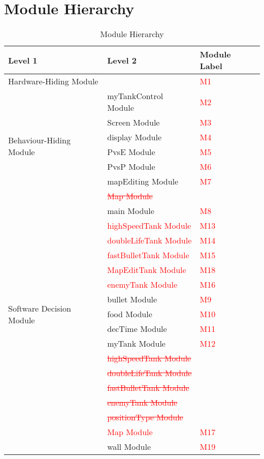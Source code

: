 \documentclass[12pt, titlepage]{article}
\begin{document}
\section{Module Hierarchy}
\begin{table}[h!]
\centering
\begin{tabular}{p{} p{} p{}}
\toprule
\textbf{Level 1} & \textbf{Level 2} & \textbf{Module Label}\\
\midrule

{Hardware-Hiding Module} & & \textcolor{red}{M1} \\
\midrule

\multirow{7}{0.3\textwidth}{Behaviour-Hiding Module} & myTankControl Module & \textcolor{red}{M2}\\
& Screen Module & \textcolor{red}{M3}\\
& display Module & \textcolor{red}{M4}\\
& PvsE Module & \textcolor{red}{M5}\\
& PvsP Module & \textcolor{red}{M6}\\
& mapEditing Module & \textcolor{red}{M7}\\
& \textcolor{red}{\sout{Map Module}}\\
& main Module & \textcolor{red}{M8}\\
& \textcolor{red}{highSpeedTank Module} & \textcolor{red}{M13}\\
& \textcolor{red}{doubleLifeTank Module} & \textcolor{red}{M14}\\
& \textcolor{red}{fastBulletTank Module} & \textcolor{red}{M15}\\
& \textcolor{red}{MapEditTank Module} & \textcolor{red}{M18}\\
& \textcolor{red}{enemyTank Module} & \textcolor{red}{M16}\\

\midrule

\multirow{3}{0.3\textwidth}{Software Decision Module} & bullet Module & \textcolor{red}{M9}\\
& food Module & \textcolor{red}{M10}\\
& decTime Module & \textcolor{red}{M11}\\
& myTank Module & \textcolor{red}{M12}\\
& \textcolor{red}{\sout{highSpeedTank Module}}\\
& \textcolor{red}{\sout{doubleLifeTank Module}}\\
& \textcolor{red}{\sout{fastBulletTank Module}}\\
& \textcolor{red}{\sout{enemyTank Module}}\\
& \textcolor{red}{\sout{positionType Module}}\\
& \textcolor{red}{Map Module} & \textcolor{red}{M17}\\
& wall Module & \textcolor{red}{M19}\\
\bottomrule

\end{tabular}
\caption{Module Hierarchy}
\label{TblMH}
\end{table}
\end{document}
